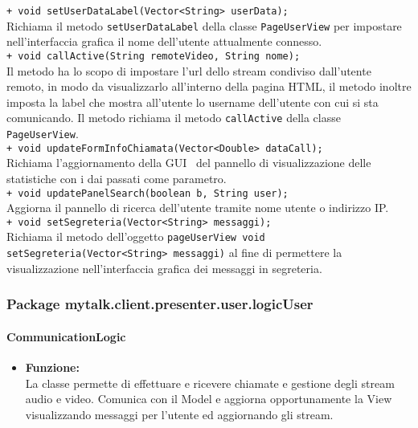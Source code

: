 {{\begin{sloppypar}
{{{\begin{itemize}
{					\texttt{+ void setUserDataLabel(Vector<String> userData);}\\
					Richiama il metodo \texttt{setUserDataLabel} della classe \texttt{PageUserView} per impostare nell'interfaccia grafica il nome dell'utente attualmente connesso.\\
					
					\texttt{+ void callActive(String remoteVideo, String nome);}\\
					Il metodo ha lo scopo di impostare l'url dello stream condiviso dall'utente remoto, in modo da visualizzarlo all'interno della pagina HTML\g, il metodo inoltre imposta la label che mostra all'utente lo username dell'utente con cui si sta comunicando. Il metodo richiama il metodo \texttt{callActive} della classe \texttt{PageUserView}.\\
					
					\texttt{+ void updateFormInfoChiamata(Vector<Double> dataCall);}\\
					Richiama l'aggiornamento della GUI\g~ del pannello di visualizzazione delle statistiche con i dai passati come parametro.\\
					
					\texttt{+ void updatePanelSearch(boolean b, String user);}\\
					Aggiorna il pannello di ricerca dell’utente tramite nome utente o indirizzo IP\g.\\
					
					\texttt{+ void setSegreteria(Vector<String> messaggi);}\\
					Richiama il metodo dell'oggetto \texttt{pageUserView void setSegreteria(Vector<String> messaggi)} al fine di permettere la visualizzazione nell'interfaccia grafica dei messaggi in segreteria.\\
				}
			\end{itemize}
			}
	
	}
	
	
	\subsubsection{Package mytalk.client.presenter.user.logicUser}{
	
			\paragraph{CommunicationLogic}\label{par:CommunicationLogic}{
			\begin{itemize}
				\item[] \textbf{Funzione:}\\
				 La classe permette di effettuare e ricevere chiamate e gestione degli stream\g~ audio e video. Comunica con il Model e aggiorna opportunamente la View visualizzando messaggi per l'utente ed aggiornando gli stream\g. \\
			

\end{itemize}}}}
\end{sloppypar}}}
